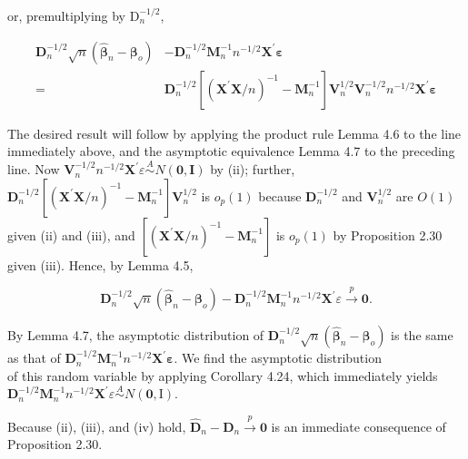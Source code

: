 \documentclass[10pt]{article}
\begin{document}
or, premultiplying by $\mathrm{D}_{n}^{-1 / 2}$,

$$
\begin{aligned}
\mathbf{D}_{n}^{-1 / 2} \sqrt{n}\left(\hat{\boldsymbol{\beta}}_{n}-\boldsymbol{\beta}_{o}\right) & -\mathbf{D}_{n}^{-1 / 2} \mathbf{M}_{n}^{-1} n^{-1 / 2} \mathbf{X}^{\prime} \boldsymbol{\varepsilon} \\
= & \mathbf{D}_{n}^{-1 / 2}\left[\left(\mathbf{X}^{\prime} \mathbf{X} / n\right)^{-1}-\mathbf{M}_{n}^{-1}\right] \mathbf{V}_{n}^{1 / 2} \mathbf{V}_{n}^{-1 / 2} n^{-1 / 2} \mathbf{X}^{\prime} \boldsymbol{\varepsilon}
\end{aligned}
$$

The desired result will follow by applying the product rule Lemma 4.6 to the line immediately above, and the asymptotic equivalence Lemma 4.7 to the preceding line. Now $\mathbf{V}_{n}^{-1 / 2} n^{-1 / 2} \mathbf{X}^{\prime} \varepsilon \stackrel{A}{\sim} N(\mathbf{0}, \mathbf{I})$ by (ii); further, $\mathbf{D}_{n}^{-1 / 2}\left[\left(\mathbf{X}^{\prime} \mathbf{X} / n\right)^{-1}-\mathbf{M}_{n}^{-1}\right] \mathbf{V}_{n}^{1 / 2}$ is $o_{p}(1)$ because $\mathbf{D}_{n}^{-1 / 2}$ and $\mathbf{V}_{n}^{1 / 2}$ are $O(1)$ given (ii) and (iii), and $\left[\left(\mathbf{X}^{\prime} \mathbf{X} / n\right)^{-1}-\mathbf{M}_{n}^{-1}\right]$ is $o_{p}(1)$ by Proposition 2.30 given (iii). Hence, by Lemma 4.5,

$$
\mathbf{D}_{n}^{-1 / 2} \sqrt{n}\left(\hat{\boldsymbol{\beta}}_{n}-\boldsymbol{\beta}_{o}\right)-\mathbf{D}_{n}^{-1 / 2} \mathbf{M}_{n}^{-1} n^{-1 / 2} \mathbf{X}^{\prime} \varepsilon \xrightarrow{p} \mathbf{0} .
$$

By Lemma 4.7, the asymptotic distribution of $\mathbf{D}_{n}^{-1 / 2} \sqrt{n}\left(\hat{\boldsymbol{\beta}}_{n}-\boldsymbol{\beta}_{o}\right)$ is the same as that of $\mathbf{D}_{n}^{-1 / 2} \mathbf{M}_{n}^{-1} n^{-1 / 2} \mathbf{X}^{\prime} \boldsymbol{\varepsilon}$. We find the asymptotic distribution\\
of this random variable by applying Corollary 4.24, which immediately yields $\mathbf{D}_{n}^{-1 / 2} \mathbf{M}_{n}^{-1} n^{-1 / 2} \mathbf{X}^{\prime} \varepsilon \stackrel{A}{\sim} N(\mathbf{0}, \mathrm{I})$.

Because (ii), (iii), and (iv) hold, $\hat{\mathbf{D}}_{n}-\mathbf{D}_{n} \xrightarrow{p} \mathbf{0}$ is an immediate consequence of Proposition 2.30.
\end{document}
